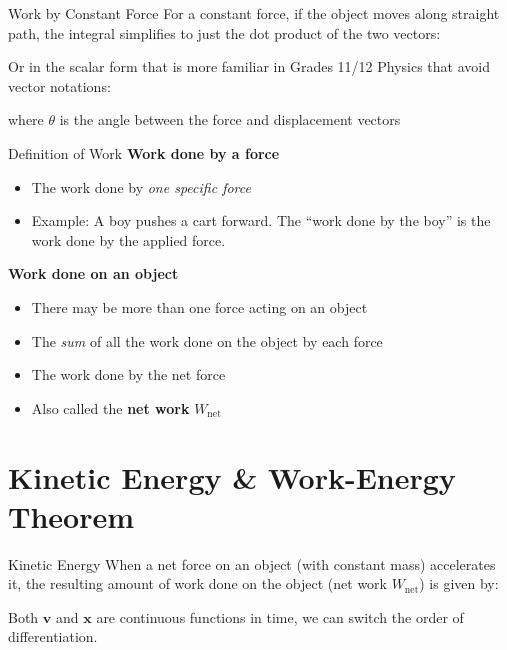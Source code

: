\documentclass[12pt,compress,aspectratio=169]{beamer}
\begin{document}
\begin{frame}{Work by Constant Force}
  For a constant force, if the object moves along straight path, the integral
  simplifies to just the dot product of the two vectors:


  Or in the scalar form that is more familiar in Grades 11/12 Physics that
  avoid vector notations:


  \vspace{-.1in}where $\theta$ is the angle between the force and displacement
  vectors
\end{frame}



\begin{frame}{Definition of Work}
  \textbf{Work done by a force}
  \begin{itemize}
  \item The work done by \emph{one specific force}
  \item Example: A boy pushes a cart forward. The ``work done by the boy'' is
    the work done by the applied force.
  \end{itemize}

  \vspace{.15in}\textbf{Work done on an object}
  \begin{itemize}
  \item There may be more than one force acting on an object
  \item The \emph{sum} of all the work done on the object by each force
  \item The work done by the net force
  \item Also called the \textbf{net work} $W_\text{net}$
  \end{itemize}
\end{frame}



\section{Kinetic Energy \& Work-Energy Theorem}

\begin{frame}{Kinetic Energy}
  When a net force on an object (with constant mass) accelerates it, the
  resulting amount of work done on the object (net work $W_\text{net}$) is
  given by:


  Both $\bm v$ and $\bm x$ are continuous functions in time, we can switch
  the order of differentiation. %

\end{frame}
\end{document}
